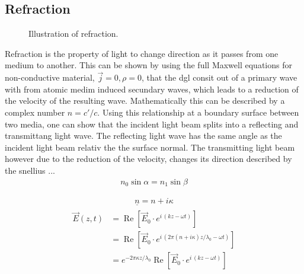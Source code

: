 \subsection{Refraction}
% 
\begin{figure}[!t]
\centering
\def\tikzwidth{\textwidth}
\label{fig:optic_refraction}
\caption{Illustration of refraction.}
\end{figure}
% 
Refraction is the property of light to change direction as it passes from one medium to another. This can be shown by using the full Maxwell equations  for non-conductive material, \ie $\vec{j} = 0, \rho = 0$, that the dgl consit out of a primary wave with from atomic medim induced secundary waves, which leads to a reduction of the velocity of the resulting wave. Mathematically this can be described by a complex number $n = c' / c$.
Using this relationship at a boundary surface between two media, one can show that the incident light beam splits into a reflecting and transmittang light wave. The reflecting light wave has the same angle as the incident light beam relativ the the surface normal. The transmitting light beam however due to the reduction of the velocity, changes its direction described by the snellius ...
\begin{align}
    n_0 \sin \alpha = n_1 \sin \beta
\end{align}

% 
\begin{align}
\underline{n} = n + i\kappa
\end{align}
% 
\begin{align}
\begin{split}
\vec{E}(z, t) &= \operatorname{Re}\! \left[\vec{E}_0 \cdot e^{i\, (kz - \omega t)}\right] \\
&= \operatorname{Re}\! \left[\vec{E}_0 \cdot e^{i\, (2\pi(n + i\kappa)z/\lambda_0 - \omega t)}\right] \\
&= e^{-2\pi \kappa z/\lambda_0} \operatorname{Re}\! \left[\vec{E}_0 \cdot e^{i\, (kz - \omega t)}\right]
\end{split}
\end{align}
% 
% 
% 
